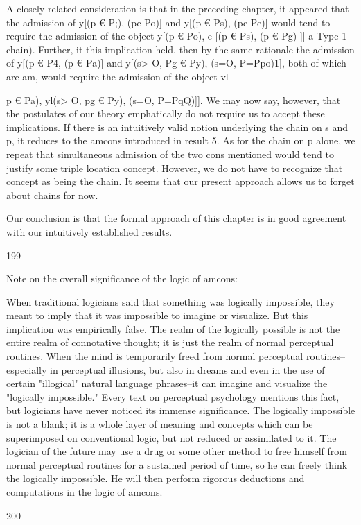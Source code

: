 \documentclass[10pt,twoside]{memoir}
\begin{document}
\begin{enumerate}
{{{A closely related consideration is that in the preceding chapter, it 
appeared that the admission of y[(p € P;), (pe Po)] and y[(p € Ps), (pe Pe)] 
would tend to require the admission of the object y[(p € Po), e [(p € Ps), (p 
€ Pg) ]] {a Type 1 chain). Further, it this implication held, then by the same 
rationale the admission of y[(p € P4}, (p € Pa)] and y[(s> O, Pg € Py), (s=O, 
P=Ppo)1], both of which are am, would require the admission of the object 
vl{p € Pa), yl(s> O, pg € Py), (s=O, P=PqQ)]]. We may now say, however, 
that the postulates of our theory emphatically do not require us to accept 
these implications. If there is an intuitively valid notion underlying the chain 
on s and p, it reduces to the amcons introduced in result 5. As for the chain 
on p alone, we repeat that simultaneous admission of the two cons 
mentioned would tend to justify some triple location concept. However, we 
do not have to recognize that concept as being the chain. It seems that our 
present approach allows us to forget about chains for now. 

Our conclusion is that the formal approach of this chapter is in good 
agreement with our intuitively established results. 


199 


Note on the overall significance of the logic of amcons: 

When traditional logicians said that something was logically impossible, 
they meant to imply that it was impossible to imagine or visualize. But this 
implication was empirically false. The realm of the logically possible is not 
the entire realm of connotative thought; it is just the realm of normal 
perceptual routines. When the mind is temporarily freed from normal 
perceptual routines--especially in perceptual illusions, but also in dreams and 
even in the use of certain "illogical" natural language phrases--it can imagine 
and visualize the "logically impossible." Every text on perceptual 
psychology mentions this fact, but logicians have never noticed its immense 
significance. The logically impossible is not a blank; it is a whole layer of 
meaning and concepts which can be superimposed on conventional logic, but 
not reduced or assimilated to it. The logician of the future may use a drug or 
some other method to free himself from normal perceptual routines for a 
sustained period of time, so he can freely think the logically impossible. He 
will then perform rigorous deductions and computations in the logic of 
amcons. 


200 


}}}}
\end{enumerate}
\end{document}
